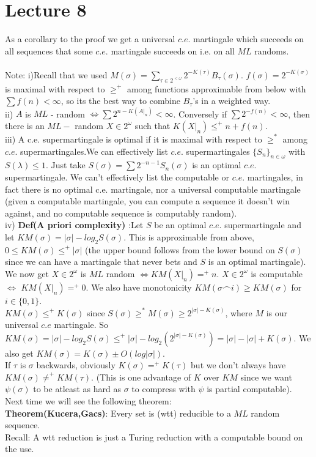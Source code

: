 \documentclass{article}
\begin{document}
	\section{Lecture 8}
    As a corollary to the proof we get a universal $c.e.$ martingale which succeeds on all sequences that some $c.e.$ martingale succeeds on i.e. on all $ML$ randoms.\\
    \\
    Note: i)Recall that we used $M(\sigma) = \sum_{\tau \in 2^{<\omega}} 2^{-K(\tau)}
     B_\tau (\sigma)$. $f(\sigma) = 2^{-K(\sigma)}$ is maximal with respect to $\geq^+$ among functions approximable from below with $\sum f(n) < \infty$, so its the best way to combine $B_\tau$'s in a weighted way.\\
     ii) $A$ is $ML$ - random $\iff \sum 2^{n-K(A|_n)} < \infty$. Conversely if $\sum 2^{-f(n)} < \infty$, then there is an $ML-$ random $X \in 2^\omega$ such that $K(X|_n) \leq^+ n + f(n)$.\\
     iii) A c.e. supermartingale is optimal if it is maximal with respect to $\geq^*$ among $c.e. $ supermartingales.We can effectively list $c.e.$ supermartingales $\{S_n\}_{n\in \omega}$ with $S(\lambda) \leq 1$. Just take $S(\sigma) = \sum 2^{-n-1} S_n(\sigma)$ is an optimal $c.e. $ supermartingale. We can't effectively list the computable or $c.e.$ martingales, in fact there is no optimal c.e. martingale, nor a universal computable martingale (given a computable martingale, you can compute a sequence it doesn't win against, and no computable sequence is computably random).\\
     iv) \textbf{Def(A priori complexity)} :Let $S$ be an optimal $c.e.$ supermartingale and let $KM(\sigma) = |\sigma| - log_2 S(\sigma)$. This is approximable from above, $0\leq KM(\sigma) \leq^+ |\sigma| $ (the upper bound follows from the lower bound on $S(\sigma)$ since we can have a martingale that never bets and $S$ is an optimal martingale). We now get $X \in 2^\omega$ is $ML$ random $\iff KM(X|_n) =^+ n$. $X \in 2^\omega$ is computable $\iff$ $KM(X|_n) =^+ 0$. We also have monotonicity $KM(\sigma\frown i) \geq KM(\sigma)$ for $i\in \{0,1\}$. \\$KM(\sigma)\leq^+ K(\sigma)$ since $S(\sigma) \geq^* M(\sigma) \geq 2^{|\sigma|-K(\sigma)}$, where $M$ is our universal $c.e$ martingale. So $KM(\sigma) = |\sigma| - log_2 S(\sigma) \leq^+ |\sigma| - log_2(2^{|\sigma| - K(\sigma)}) = |\sigma| - |\sigma| + K(\sigma)$. We also get $KM(\sigma) = K(\sigma) \pm O(log|\sigma|)$. \\
     If $\tau$ is $\sigma$ backwards, obviously $K(\sigma) =^+ K(\tau)$ but we don't always have $KM(\sigma) \neq^+KM(\tau)$. (This is one advantage of $K$ over $KM$ since we want $\psi(\sigma)$ to be atleast as hard as $\sigma$ to compress with $\psi$ is partial computable).
     \\
     Next time we will see the following theorem:\\
     \textbf{Theorem(Kucera,Gacs)}: Every set is (wtt) reducible to a $ML$ random sequence.\\
     Recall: A wtt reduction is just a Turing reduction with a computable bound on the use.
     
\end{document}
